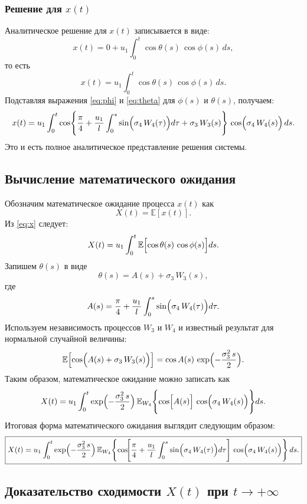 \documentclass[12pt]{article}
\begin{document}
\subsubsection*{Решение для $x(t)$}
Аналитическое решение для $x(t)$ записывается в виде:
\begin{equation}\label{eq:x}
	x(t)=0+u_1\int_{0}^{t}\cos\theta(s)\,\cos\phi(s) \,ds,
\end{equation}
то есть
\[
	x(t)=u_1\int_{0}^{t}\cos\theta(s)\,\cos\phi(s) \,ds.
\]
Подставляя выражения \eqref{eq:phi} и \eqref{eq:theta} для $\phi(s)$ и $\theta(s)$, получаем:
\[
	x(t)=u_1\int_{0}^{t}\cos\Biggl\{\frac{\pi}{4}+\frac{u_1}{l}\int_{0}^{s}\sin\Bigl(\sigma_4\,W_4(\tau)\Bigr)d\tau+\sigma_3\,W_3(s)\Biggr\}\,
	\cos\Bigl(\sigma_4\,W_4(s)\Bigr)\, ds.
\]
Это и есть полное аналитическое представление решения системы.

\subsection{Вычисление математического ожидания}

Обозначим математическое ожидание процесса $x(t)$ как
\[
	X(t)=\mathbb{E}[x(t)].
\]
Из \eqref{eq:x} следует:
\[
	X(t)=u_1\int_{0}^{t}\mathbb{E}\Bigl[\cos\theta(s)\,\cos\phi(s)\Bigr]ds.
\]
Запишем $\theta(s)$ в виде
\[
	\theta(s)=A(s)+\sigma_3\,W_3(s),
\]
где
\[
	A(s)=\frac{\pi}{4}+\frac{u_1}{l}\int_{0}^{s}\sin\Bigl(\sigma_4\,W_4(\tau)\Bigr)d\tau.
\]
Используем независимость процессов $W_3$ и $W_4$ и известный результат для нормальной случайной величины:
\[
	\mathbb{E}\Bigl[\cos\Bigl(A(s)+\sigma_3\,W_3(s)\Bigr)\Bigr]=\cos A(s)\,\exp\Bigl(-\frac{\sigma_3^2\, s}{2}\Bigr).
\]
Таким образом, математическое ожидание можно записать как
\[
	X(t)=u_1\int_{0}^{t}\exp\Bigl(-\frac{\sigma_3^2\, s}{2}\Bigr)\,
	\mathbb{E}_{W_4}\Biggl\{\cos\Bigl[A(s)\Bigr]\,\cos\Bigl(\sigma_4\,W_4(s)\Bigr)\Biggr\}ds.
\]
Итоговая форма математического ожидания выглядит следующим образом:
\begin{equation}\label{eq:X}
	\boxed{
		X(t)= u_1\int_{0}^{t}\exp\Bigl(-\frac{\sigma_3^2\, s}{2}\Bigr)\,
		\mathbb{E}_{W_4}\!\left\{\cos\!\Biggl[\frac{\pi}{4}+\frac{u_1}{l}\int_{0}^{s}\sin\Bigl(\sigma_4\,W_4(\tau)\Bigr)d\tau\Biggr]\,\cos\Bigl(\sigma_4\,W_4(s)\Bigr)\right\}ds.
	}
\end{equation}

\subsection{Доказательство сходимости $X(t)$ при $t\to+\infty$}
\end{document}
